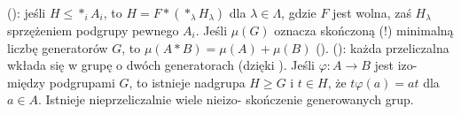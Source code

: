  (): jeśli $H \le *_i A_i$, to $H = F * (*_\lambda H_\lambda)$ dla $\lambda \in \Lambda$, gdzie $F$ jest wolna, zaś $H_\lambda$ sprzężeniem podgrupy pewnego $A_i$.
Jeśli $\mu(G)$ oznacza skończoną (!) minimalną liczbę generatorów $G$, to $\mu(A * B) = \mu(A) + \mu(B)$ ().
 (): każda przeliczalna wkłada się w grupę o dwóch generatorach (dzięki ).
Jeśli $\varphi \colon A \to B$ jest izo- między podgrupami $G$, to istnieje nadgrupa $H \ge G$ i $t \in H$, że $t \varphi(a) = at$ dla $a \in A$.
Istnieje nieprzeliczalnie wiele nieizo- skończenie generowanych grup.